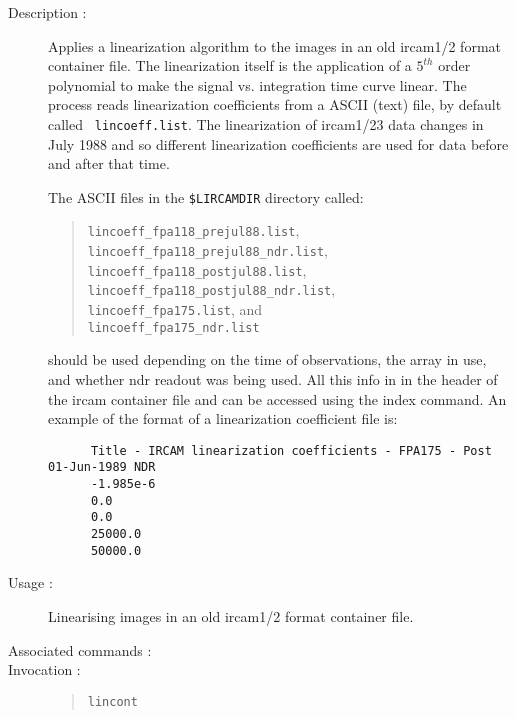 \begin{description}

\item[Description :] Applies a linearization algorithm to the images in
an old {\sc ircam1/2} format container file.  The linearization itself
is the application of a $5^{th}$ order polynomial to make the signal vs.
integration time curve linear.  The process reads linearization
coefficients from a ASCII (text) file, by default called {\tt
lincoeff.list}.  The linearization of {\sc ircam1/2}3 data changes in
July 1988 and so different linearization coefficients are used for data
before and after that time.

The ASCII files in the {\tt \$LIRCAMDIR} directory called:

\begin{quote}
{\tt lincoeff\_fpa118\_prejul88.list}, \\
{\tt lincoeff\_fpa118\_prejul88\_ndr.list}, \\
{\tt lincoeff\_\-fpa118\_postjul88.list}, \\
{\tt lincoeff\_fpa118\_postjul88\_ndr.list}, \\
{\tt lincoeff\_fpa175.\-list}, and \\
{\tt lincoeff\_fpa175\_ndr.list} 
\end{quote}

should be used depending on the time of observations, the array in use,
and whether ndr readout was being used.  All this info in in the header
of the {\sc ircam} container file and can be accessed using the index
command. An example of the format of a linearization coefficient file
is:

\begin{small}
\begin{verbatim}
      Title - IRCAM linearization coefficients - FPA175 - Post 01-Jun-1989 NDR 
      -1.985e-6 
      0.0 
      0.0 
      25000.0 
      50000.0 
\end{verbatim}
\end{small}

\item[Usage :] Linearising images in an old {\sc ircam1/2} format container
file.

\item[Associated commands :] {\tt {}}

\item[Invocation :]

\begin{quote}{\tt  lincont }\end{quote}

\end{description}

